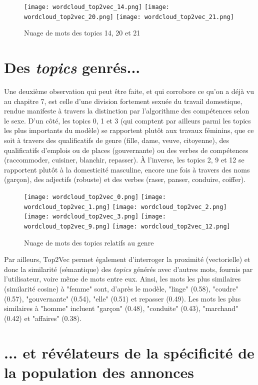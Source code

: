\begin{figure}[ht]
	\centering
	\texttt{[image: wordcloud\_top2vec\_14.png]}
	\texttt{[image: wordcloud\_top2vec\_20.png]}
	\texttt{[image: wordcloud\_top2vec\_21.png]}
	\caption{Nuage de mots des topics 14, 20 et 21}
\end{figure}

\section{Des \textit{topics} genrés...}

Une deuxième observation qui peut être faite, et qui corrobore ce qu'on a déjà vu au chapitre 7, est celle d'une division fortement sexuée du travail domestique, rendue manifeste à travers la distinction par l'algorithme des compétences selon le sexe. D'un côté, les topics 0, 1 et 3 (qui comptent par ailleurs parmi les topics les plus importants du modèle) se rapportent plutôt aux travaux féminins, que ce soit à travers des qualificatifs de genre (fille, dame, veuve, citoyenne), des qualificatifs d'emplois ou de places (gouvernante) ou des verbes de compétences (raccommoder, cuisiner, blanchir, repasser). À l'inverse, les topics 2, 9 et 12 se rapportent plutôt à la domesticité masculine, encore une fois à travers des noms (garçon), des adjectifs (robuste) et des verbes (raser, panser, conduire, coiffer). 


\begin{figure}[h!t]
	\centering
	\texttt{[image: wordcloud\_top2vec\_0.png]}
	\texttt{[image: wordcloud\_top2vec\_1.png]}
	\texttt{[image: wordcloud\_top2vec\_2.png]}
	\texttt{[image: wordcloud\_top2vec\_3.png]}
	\texttt{[image: wordcloud\_top2vec\_9.png]}
	\texttt{[image: wordcloud\_top2vec\_12.png]}
	\caption{Nuage de mots des topics relatifs au genre}
\end{figure}


Par ailleurs, Top2Vec permet également d'interroger la proximité (vectorielle) et donc la similarité (sémantique) des \textit{topics} générés avec d'autres mots, fournis par l'utilisateur, voire même de mots entre eux. Ainsi, les mots les plus similaires (similarité cosine) à "femme" sont, d'après le modèle, "linge" (0.58), "coudre" (0.57), "gouvernante" (0.54), "elle" (0.51) et repasser (0.49). Les mots les plus similaires à "homme" incluent "garçon" (0.48), "conduite" (0.43), "marchand" (0.42) et "affaires" (0.38).

\section{... et révélateurs de la spécificité de la population des annonces}

